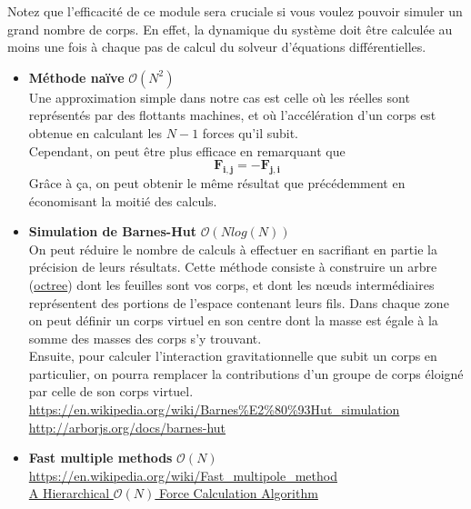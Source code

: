 \documentclass{article}
\newcommand{\myvec}[1]{\ensuremath{\mathbf{#1}}}
\begin{document}
Notez que l'efficacité de ce module sera cruciale si vous voulez pouvoir simuler un grand nombre de corps. En effet, la dynamique du système doit être calculée au moins une fois à chaque pas de calcul du solveur d'équations différentielles.

\begin{itemize}
    \item \textbf{Méthode naïve} $\mathcal{O}(N^2)$ \\
    Une approximation simple dans notre cas est celle où les réelles sont représentés par des flottants machines, et où l'accélération d'un corps est obtenue en calculant les $N-1$ forces qu'il subit.\\
    Cependant, on peut être plus efficace en remarquant que
    \begin{equation*}
    \myvec{F_{i,j}} = - \myvec{F_{j,i}}
    \end{equation*}
    Grâce à ça, on peut obtenir le même résultat que précédemment en économisant la moitié des calculs.
    \item \textbf{Simulation de Barnes-Hut} $\mathcal{O}(N log(N))$ \\
    On peut réduire le nombre de calculs à effectuer en sacrifiant en partie la précision de leurs résultats. Cette méthode consiste à construire un arbre (\href{https://en.wikipedia.org/wiki/Octree}{octree}) dont les feuilles sont vos corps, et dont les nœuds intermédiaires représentent des portions de l'espace contenant leurs fils. Dans chaque zone on peut définir un corps virtuel en son centre dont la masse est égale à la somme des masses des corps s'y trouvant. \\
    Ensuite, pour calculer l'interaction gravitationnelle que subit un corps en particulier, on pourra remplacer la contributions d'un groupe de corps éloigné par celle de son corps virtuel. \\
    \url{https://en.wikipedia.org/wiki/Barnes\%E2\%80\%93Hut_simulation}\\
    \url{http://arborjs.org/docs/barnes-hut}
    \item \textbf{Fast multiple methods} $\mathcal{O}(N)$ \\
    \url{https://en.wikipedia.org/wiki/Fast_multipole_method}\\
    \href{https://arxiv.org/pdf/astro-ph/0202512.pdf}{A Hierarchical $\mathcal{O}(N)$ Force Calculation Algorithm}
\end{itemize}

\vspace{1em}
\end{document}
